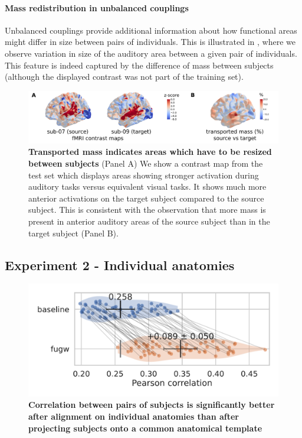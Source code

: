 \paragraph{Mass redistribution in unbalanced couplings}
Unbalanced couplings provide additional information about how functional areas might differ
in size between pairs of individuals. This is illustrated in ,
where we observe variation in size of the auditory area between a given pair of individuals.
This feature is indeed captured by the difference of mass between subjects
(although the displayed contrast was not part of the training set).
\begin{figure}[!th]
    \centering
    \includegraphics[width=1\columnwidth]{./Chapitre4/figures/transported_mass.pdf}
    \caption{
        \textbf{Transported mass indicates areas which have to be resized between subjects}
        (Panel A) We show a contrast map from the test set which displays areas showing
        stronger activation during auditory tasks versus equivalent visual tasks. It shows much more
        anterior activations on the target subject compared to the source subject.
        This is consistent with the observation that more mass is present in
        anterior auditory areas of the source subject than in the target subject (Panel B).
    }
    \label{fig:transported_mass}
\end{figure}

\subsection{Experiment 2 - Individual anatomies}
\begin{figure}[!ht]
    \centering
    \includegraphics[width=0.5\columnwidth]{./Chapitre4/figures/individual_alignment_correlation_gain_fugw}
    \caption{
        \textbf{Correlation between pairs of subjects is significantly better after alignment on individual anatomies than after projecting subjects onto a common anatomical template}
    }
    \label{fig:gain_comparisions_individual}
\end{figure}

